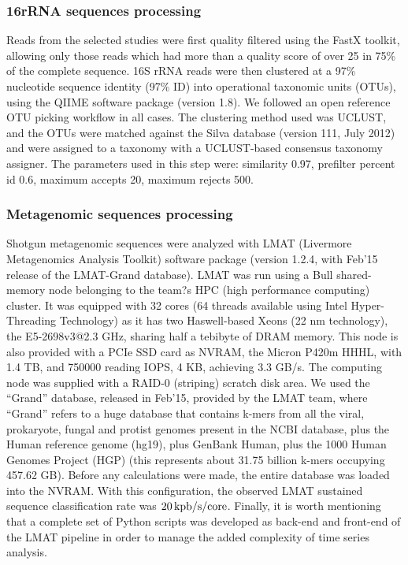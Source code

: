 \subsubsection*{16rRNA sequences processing}
Reads from the selected studies were first quality filtered using the FastX toolkit\cite{FASTX}, allowing only those reads which had more than a quality score of over 25 in 75\% of the complete sequence. 16S rRNA reads were then clustered at a 97\% nucleotide sequence identity (97\% ID) into operational taxonomic units (OTUs), using the QIIME software package\cite{QIIME} (version 1.8). We followed an open reference OTU picking workflow in all cases. The clustering method used was UCLUST, and the OTUs were matched against the Silva database\cite{SILVA} (version 111, July 2012) and were assigned to a taxonomy with a UCLUST-based consensus taxonomy assigner. The parameters used in this step were: similarity 0.97, prefilter percent id 0.6, maximum accepts 20, maximum rejects 500. 

\subsubsection*{Metagenomic sequences processing}
Shotgun metagenomic sequences were analyzed with LMAT (Livermore Metagenomics Analysis Toolkit) software package\cite{LMAT} (version 1.2.4, with Feb'15 release of the LMAT-Grand database). LMAT was run using a Bull shared-memory node belonging to the team?s HPC (high performance computing) cluster. It was equipped with 32 cores (64 threads available using Intel Hyper-Threading Technology) as it has two Haswell-based Xeons (22 nm technology), the E5-2698v3@2.3 GHz, sharing half a tebibyte of DRAM memory. This node is also provided with a PCIe SSD card as NVRAM, the Micron P420m HHHL, with 1.4 TB, and 750000 reading IOPS, 4 KB, achieving 3.3 GB/s. The computing node was supplied with a RAID-0 (striping) scratch disk area. We used the ``Grand'' database\cite{LMAT2}, released in Feb'15, provided by the LMAT team, where ``Grand'' refers to a huge database that contains k-mers from all the viral, prokaryote, fungal and protist genomes present in the NCBI database, plus the Human reference genome (hg19), plus GenBank Human, plus the 1000 Human Genomes Project (HGP) (this represents about 31.75 billion k-mers occupying 457.62 GB)\cite{LMAT2}. Before any calculations were made, the entire database was loaded into the NVRAM. With this configuration, the observed LMAT sustained sequence classification rate was $20\operatorname{kpb/s/core}$. Finally, it is worth mentioning that a complete set of Python scripts was developed as back-end and front-end of the LMAT pipeline in order to manage the added complexity of time series analysis. 

